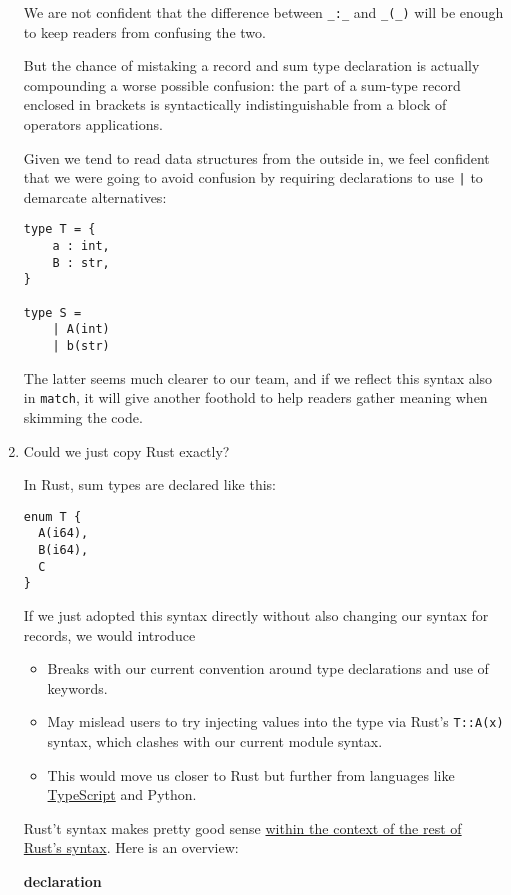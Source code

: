 \documentclass[11pt]{article}
\begin{document}
\begin{enumerate}
We are not confident that the difference between \texttt{\_:\_} and \texttt{\_(\_)} will be enough
to keep readers from confusing the two.

But the chance of mistaking a record and sum type declaration is actually
compounding a worse possible confusion: the part of a sum-type record enclosed
in brackets is syntactically indistinguishable from a block of operators
applications.

Given we tend to read data structures from the outside in, we feel confident
that we were going to avoid confusion by requiring declarations to use \texttt{|} to
demarcate alternatives:

\begin{verbatim}
type T = {
    a : int,
    B : str,
}

type S =
    | A(int)
    | b(str)
\end{verbatim}

The latter seems much clearer to our team, and if we reflect this syntax also in
\texttt{match}, it will give another foothold to help readers gather meaning when
skimming the code.


\item Could we just copy Rust exactly?
\label{sec:org9e9a2cd}

In Rust, sum types are declared like this:

\begin{verbatim}
enum T {
  A(i64),
  B(i64),
  C
}
\end{verbatim}

If we just adopted this syntax directly without also changing our syntax for
records, we would introduce

\begin{itemize}
\item Breaks with our current convention around type declarations and
use of keywords.
\item May mislead users to try injecting values into the type via Rust's
\texttt{T::A(x)} syntax, which clashes with our current module syntax.
\item This would move us closer to Rust but further from languages like \href{https://www.typescriptlang.org/docs/handbook/2/everyday-types.html\#type-aliases}{TypeScript}
and Python.
\end{itemize}

Rust't syntax makes pretty good sense \uline{within the context of the rest of Rust's
syntax}. Here is an overview:

\textbf{declaration}


\end{enumerate}
\end{document}
